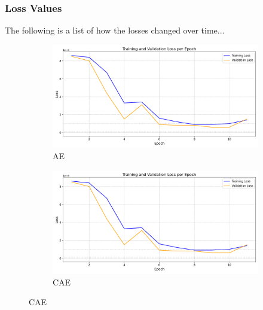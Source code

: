 \subsubsection{Loss Values}

The following is a list of how the losses changed over time...


\begin{figure}[!htbp]
  \centering
  \begin{subfigure}[t]{.6\textwidth}
    \centering
    \includegraphics[width=\linewidth]{figures/losses/ae.png}
    \caption{AE}
  \end{subfigure}
  \hfill
  \begin{subfigure}[t]{.6\textwidth}
    \centering
    \includegraphics[width=\linewidth]{figures/losses/ae.png}
    \caption{CAE}
  \end{subfigure}
  
  \vspace{1cm}
  

\end{figure}
